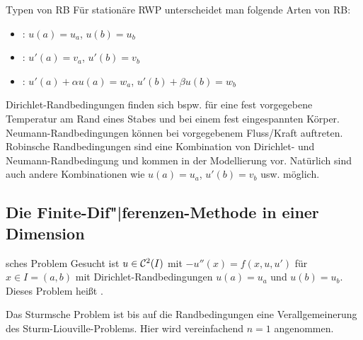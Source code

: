 \linie

\begin{Def}{Typen von RB}
    Für stationäre RWP unterscheidet man folgende Arten von RB:
    \begin{itemize}
        \item
        :
        $u(a) = u_a$, $u(b) = u_b$
        
        \item
        :
        $u'(a) = v_a$, $u'(b) = v_b$
        
        \item
        :
        $u'(a) + \alpha u(a) = w_a$, $u'(b) + \beta u(b) = w_b$
    \end{itemize}
\end{Def}

\begin{Bsp}
    Dirichlet-Randbedingungen finden sich bspw. für eine fest vorgegebene
    Temperatur am Rand eines Stabes und bei einem fest eingespannten Körper.
    Neumann-Randbedingungen können bei vorgegebenem Fluss/Kraft auftreten.
    Robinsche Randbedingungen sind eine Kombination von Dirichlet- und
    Neumann-Randbedin\-gung und kommen in der Modellierung vor.
    Natürlich sind auch andere Kombinationen wie
    $u(a) = u_a$, $u'(b) = v_b$ usw. möglich.
\end{Bsp}

\pagebreak

\subsection{%
    Die Finite-Dif"|ferenzen-Methode in einer Dimension%
}

\begin{Def}{sches Problem}
    Gesucht ist $u \in \mathcal{C}^2(I)$ mit $-u''(x) = f(x, u, u')$ für
    $x \in I = (a, b)$ mit Dirichlet-Randbedingungen
    $u(a) = u_a$ und $u(b) = u_b$.\\
    Dieses Problem heißt .
\end{Def}

\begin{Bem}
    Das Sturmsche Problem ist bis auf die Randbedingungen eine
    Verallgemeinerung des Sturm-Liouville-Problems.
    Hier wird vereinfachend $n = 1$ angenommen.
\end{Bem}

\linie

